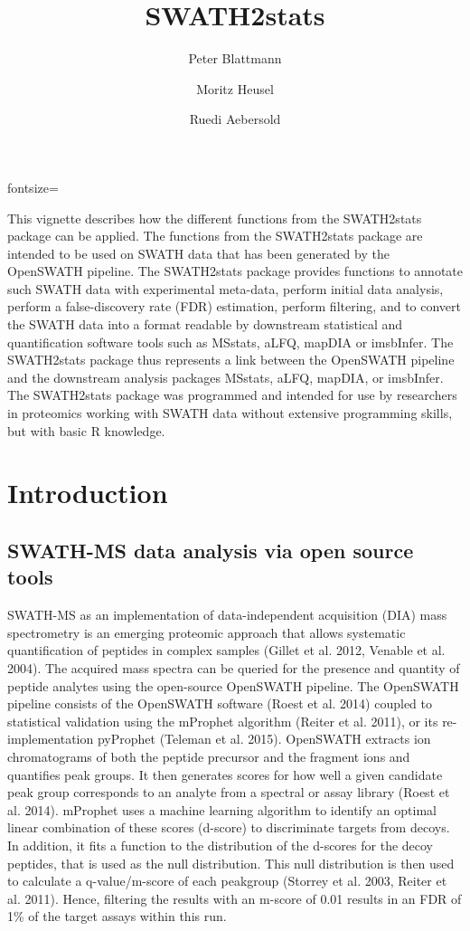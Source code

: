 \documentclass[a4paper]{article}
\title{SWATH2stats}
\author{Peter Blattmann}
\author{Moritz Heusel}
\author{Ruedi Aebersold}
\affil{Institute of Molecular Systems Biology, Department of Biology, ETH Zurich, Switzerland}
\begin{document}
\maketitle



 {fontsize=\small}

This vignette describes how the different functions from the SWATH2stats package can be applied. The functions from the SWATH2stats package are intended to be used on SWATH data that has been generated by the OpenSWATH pipeline. The SWATH2stats package provides functions to annotate such SWATH data with experimental meta-data, perform initial data analysis, perform a false-discovery rate (FDR) estimation, perform filtering, and to convert the SWATH data into a format readable by downstream statistical and quantification software tools such as MSstats, aLFQ, mapDIA or imsbInfer. The SWATH2stats package thus represents a link between the OpenSWATH pipeline and the downstream analysis packages MSstats, aLFQ, mapDIA, or imsbInfer. The SWATH2stats package was programmed and intended for use by researchers in proteomics working with SWATH data without extensive programming skills, but with basic R knowledge.

\tableofcontents
\section{Introduction}
\subsection{SWATH-MS data analysis via open source tools}
SWATH-MS as an implementation of data-independent acquisition (DIA) mass spectrometry is an emerging proteomic approach that allows systematic quantification of peptides in complex samples (Gillet et al. 2012, Venable et al. 2004). The acquired mass spectra can be queried for the presence and quantity of peptide analytes using the open-source OpenSWATH pipeline. The OpenSWATH pipeline consists of the OpenSWATH software (Roest et al. 2014) coupled to statistical validation using the mProphet algorithm (Reiter et al. 2011), or its re-implementation pyProphet (Teleman et al. 2015). OpenSWATH extracts ion chromatograms of both the peptide precursor and the fragment ions and quantifies peak groups. It then generates scores for how well a given candidate peak group corresponds to an analyte from a spectral or assay library (Roest et al. 2014). mProphet uses a machine learning algorithm to identify an optimal linear combination of these scores (d-score) to discriminate targets from decoys. In addition, it fits a function to the distribution of the d-scores for the decoy peptides, that is used as the null distribution. This null distribution is then used to calculate a q-value/m-score of each peakgroup (Storrey et al. 2003, Reiter et al. 2011). Hence, filtering the results with an m-score of 0.01 results in an FDR of 1\% of the target assays within this run.
\end{document}
